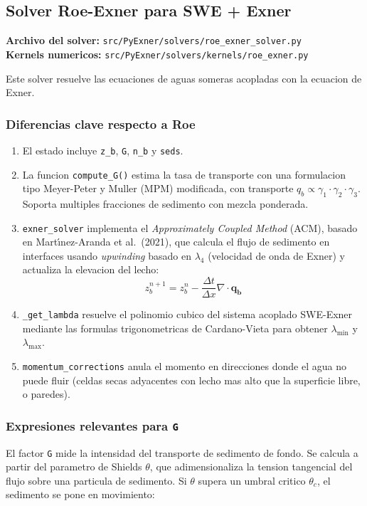 \documentclass[11pt,a4paper]{article}
\newcommand{\code}[1]{\texttt{#1}}
\begin{document}
\subsection{Solver Roe-Exner para SWE + Exner}

\textbf{Archivo del solver:} \code{src/PyExner/solvers/roe\_exner\_solver.py}\\
\textbf{Kernels numericos:} \code{src/PyExner/solvers/kernels/roe\_exner.py}

Este solver resuelve las ecuaciones de aguas someras acopladas con la ecuacion de Exner.

\subsubsection{Diferencias clave respecto a Roe}

\begin{enumerate}[leftmargin=1.8em]
  \item El estado incluye \code{z\_b}, \code{G}, \code{n\_b} y \code{seds}.
  \item La funcion \code{compute\_G()} estima la tasa de transporte con una formulacion tipo
  Meyer-Peter y Muller (MPM) modificada, con transporte $q_b \propto \gamma_1 \cdot \gamma_2 \cdot \gamma_3$.
  Soporta multiples fracciones de sedimento con mezcla ponderada.
  \item \code{exner\_solver} implementa el \emph{Approximately Coupled Method} (ACM), basado en
  Mart\'{\i}nez-Aranda et al.\ (2021), que calcula el flujo de sedimento en interfaces usando
  \emph{upwinding} basado en $\lambda_4$ (velocidad de onda de Exner) y actualiza la elevacion del lecho:
  \[
    z_b^{n+1} = z_b^n - \frac{\Delta t}{\Delta x}\nabla \cdot \mathbf{q_b}
  \]
  \item \code{\_get\_lambda} resuelve el polinomio cubico del sistema acoplado SWE-Exner
  mediante las formulas trigonometricas de Cardano-Vieta para obtener $\lambda_{\min}$ y $\lambda_{\max}$.
  \item \code{momentum\_corrections} anula el momento en direcciones donde el agua no puede fluir
  (celdas secas adyacentes con lecho mas alto que la superficie libre, o paredes).
\end{enumerate}

\subsubsection{Expresiones relevantes para \code{G}}

El factor \code{G} mide la intensidad del transporte de sedimento de fondo. Se calcula a partir
del parametro de Shields $\theta$, que adimensionaliza la tension tangencial del flujo sobre una
particula de sedimento. Si $\theta$ supera un umbral critico $\theta_c$, el sedimento se pone
en movimiento:
\end{document}
